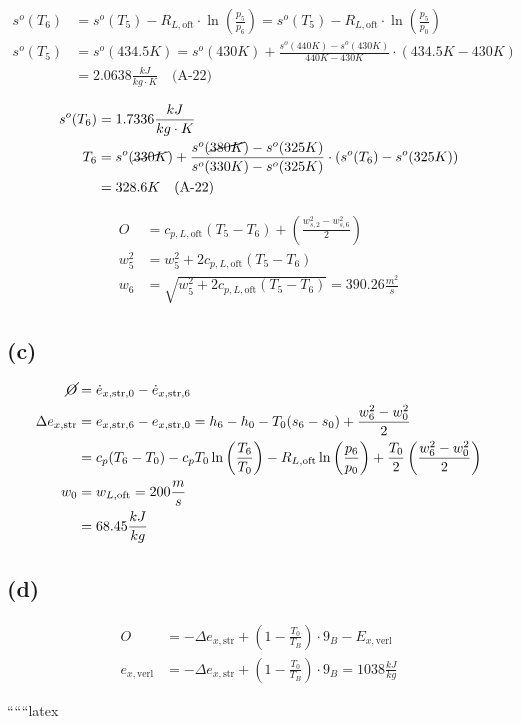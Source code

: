 \begin{align*}
    s^o(T_6) &= s^o(T_5) - R_{L, \text{oft}} \cdot \ln \left( \frac{p_5}{p_6} \right) = s^o(T_5) - R_{L, \text{oft}} \cdot \ln \left( \frac{p_5}{p_0} \right) \\
    s^o(T_5) &= s^o(434.5K) = s^o(430K) + \frac{s^o(440K) - s^o(430K)}{440K - 430K} \cdot (434.5K - 430K) \\
    &= 2.0638 \frac{kJ}{kg \cdot K} \quad \text{(A-22)}
\end{align*}

\begin{align*}
    s^o(T_6) &= 1.7336 \frac{kJ}{kg \cdot K} \\
    T_6 &= s^o(\cancel{330K}) + \frac{s^o(\cancel{380K}) - s^o(325K)}{s^o(330K) - s^o(325K)} \cdot (s^o(T_6) - s^o(325K)) \\
    &= 328.6K \quad \text{(A-22)}
\end{align*}

\begin{align*}
    O &= c_{p, L, \text{oft}} (T_5 - T_6) + \left( \frac{w_{s, 2}^2 - w_{s, 6}^2}{2} \right) \\
    w_5^2 &= w_5^2 + 2 c_{p, L, \text{oft}} (T_5 - T_6) \\
    w_6 &= \sqrt{w_5^2 + 2 c_{p, L, \text{oft}} (T_5 - T_6)} = 390.26 \frac{m^2}{s}
\end{align*}

\subsection*{(c)}

\begin{align*}
    \cancel{O} &= \dot{e}_{x, \text{str}, 0} - \dot{e}_{x, \text{str}, 6} \\
    \Delta e_{x, \text{str}} &= e_{x, \text{str}, 6} - e_{x, \text{str}, 0} = h_6 - h_0 - T_0 (s_6 - s_0) + \frac{w_6^2 - w_0^2}{2} \\
    &= c_p (T_6 - T_0) - c_p T_0 \ln \left( \frac{T_6}{T_0} \right) - R_{L, \text{oft}} \ln \left( \frac{p_6}{p_0} \right) + \frac{T_0}{2} \left( \frac{w_6^2 - w_0^2}{2} \right) \\
    w_0 &= w_{L, \text{oft}} = 200 \frac{m}{s} \\
    &= 68.45 \frac{kJ}{kg}
\end{align*}

\subsection*{(d)}

\begin{align*}
    O &= -\Delta e_{x, \text{str}} + \left( 1 - \frac{T_0}{T_B} \right) \cdot 9_B - E_{x, \text{verl}} \\
    e_{x, \text{verl}} &= -\Delta e_{x, \text{str}} + \left( 1 - \frac{T_0}{T_B} \right) \cdot 9_B = 1038 \frac{kJ}{kg}
\end{align*}

``````latex


